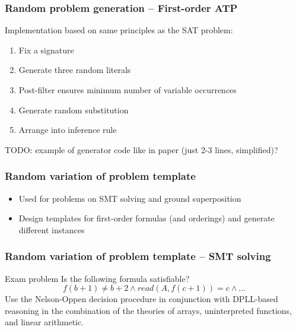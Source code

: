 \documentclass[xcolor={table}]{beamer}
\begin{document}
\begin{frame}
    \frametitle{Random problem generation -- First-order ATP}

    Implementation based on same principles as the SAT problem:
    \begin{enumerate}
        \item Fix a signature
        \item Generate three random literals
        \item Post-filter ensures minimum number of variable occurrences
        \item Generate random substitution
        \item Arrange into inference rule
    \end{enumerate}

    TODO: example of generator code like in paper (just 2-3 lines, simplified)?
\end{frame}



\begin{frame}
  \frametitle{Random variation of problem template}
\begin{itemize}
\item Used for problems on SMT solving and ground superposition
\item Design templates for first-order formulas (and orderings)
  and generate different instances
\end{itemize}
\end{frame}



\begin{frame}
    \frametitle{Random variation of problem template -- SMT solving}

    \begin{block}{Exam problem}
        Is the following formula satisfiable?
        \[
            f(b+1) \neq b+2
            \land
            read(A,f(c+1))=c
            \land
            \dots
        \]
        Use the Nelson-Oppen decision procedure
        in conjunction with DPLL-based reasoning
        in the combination of the theories of
        arrays, uninterpreted functions, and linear arithmetic.
    \end{block}
\end{frame}
\end{document}
